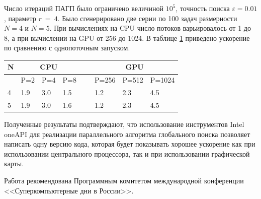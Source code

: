 \documentclass[10pt,a4paper]{book}
\begin{document}
Число итераций ПАГП было ограничено величиной $10^5$, точность поиска $\varepsilon=0.01$, параметр $r\ =\ 4$. Было сгенерировано две серии по 100 задач размерности $N = 4$ и $N = 5$. При вычислениях на CPU число потоков варьировалось от 1 до 8, а при вычислении на GPU от 256 до 1024. В таблице \ref{table3} приведено ускорение по сравнению с однопоточным запуском.

\begin{table}[!ht]
    \centering
    \label{table3}
    \begin{tabular}{|l|l|l|l|l|l|l|l|}
    \hline
        N &\multicolumn{3}{c|}{CPU} & ~ & \multicolumn{3}{c|}{GPU} \\ \hline
        ~ & P=2 & P=4 & P=8 & ~ & P=256 & P=512 & P=1024  \\ \hline
        4 & 1.9 & 3.0 & 1.5 & ~ & 1.2 & 2.3 & 4.5  \\ \hline
        5 & 1.9 & 3.0 & 1.6 & ~ & 1.2 & 2.3 & 4.5  \\ \hline
    \end{tabular}
\end{table}

Полученные результаты подтверждают, что использование инструментов Intel oneAPI для реализации параллельного алгоритма глобального поиска позволяет написать одну версию кода, которая будет показывать хорошее ускорение как при использовании центрального процессора, так и при использовании графической карты. 

Работа рекомендована Программным комитетом международной конференции <<Суперкомпьютерные дни в России>>.


%
%


\LITERRUS

\end{document}
